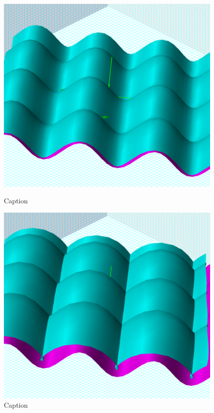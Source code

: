 \begin{figure}[H] 
  \label{surface-1} 
  \centering
  \begin{minipage}[b]{0.3\linewidth}
    \centering
    \includegraphics[width=.9\linewidth]{surfaces-img/Fig 39.png} 
    \caption{Caption} 
    \label{fig:fig39}
    \vspace{4ex}
  \end{minipage} %
  \begin{minipage}[b]{0.3\linewidth}
    \centering
    \includegraphics[width=.9\linewidth]{surfaces-img/Fig 40.png} 
    \caption{Caption} 
    \label{fig:fig40}

\end{minipage}
\end{figure}
